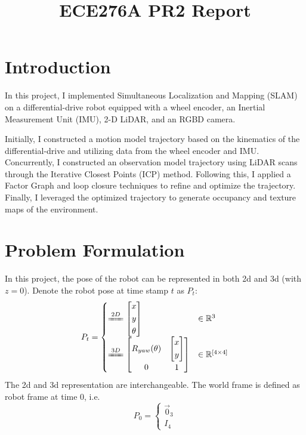 \documentclass[conference]{IEEEtran}
\begin{document}
\title{ECE276A PR2 Report}

\author{
}

\maketitle


\section{Introduction}
In this project, I implemented Simultaneous Localization and Mapping (SLAM) 
on a differential-drive robot 
equipped with a wheel encoder, an Inertial Measurement Unit (IMU), 
2-D LiDAR, and an RGBD camera.

Initially, I constructed a motion model trajectory 
based on the kinematics of the differential-drive and 
utilizing data from the wheel encoder and IMU. 
Concurrently, I constructed an observation model trajectory 
using LiDAR scans through the Iterative Closest Points (ICP) method. 
Following this, I applied a Factor Graph and loop closure techniques to 
refine and optimize the trajectory. 
Finally, I leveraged the optimized trajectory to 
generate occupancy and texture maps of the environment.

\section{Problem Formulation}

In this project, the pose of the robot can be represented in both 2d and 3d (with $z = 0$).
Denote the robot pose at time stamp $t$ as $P_t$:
$$
P_{t} = \begin{cases}
    \xlongequal{2D} \left[ \begin{gathered}x\\ y\\ \theta \end{gathered} \right] & \in \mathbb{R}^{3} \\ 
    \xlongequal{3D} \left[ \begin{matrix}R_{yaw}(\theta )&\left[ \begin{gathered}x\\ y\end{gathered} \right]  \\ 0&1\end{matrix} \right] & \in \mathbb{R}^{[4\times 4]}
\end{cases} 
$$
The 2d and 3d representation are interchangeable.
The world frame is defined as robot frame at time 0, i.e.
$$P_{0}=\begin{cases}\vec{0}_{3}\\ I_{4}\end{cases} $$
\end{document}
